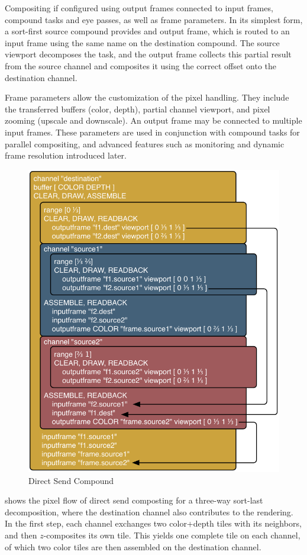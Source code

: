 Compositing if configured using output frames connected to input frames,
compound tasks and eye passes, as well as frame parameters. In its simplest
form, a sort-first source compound provides and output frame, which is routed to
an input frame using the same name on the destination compound. The source
viewport decomposes the task, and the output frame collects this partial result
from the source channel and composites it using the correct offset onto the
destination channel.

Frame parameters allow the customization of the pixel handling. They include the
transferred buffers (color, depth), partial channel viewport, and pixel zooming
(upscale and downscale). An output frame may be connected to multiple input
frames. These parameters are used in conjunction with compound tasks for
parallel compositing, and advanced features such as monitoring and dynamic frame
resolution introduced later.

\begin{figure}
 \includegraphics[width=.618\textwidth]{images/directSendCompound}
 {\caption{\label{fDirectSendCmp}Direct Send Compound}}
\end{figure}

 shows the pixel flow of direct send composting for a three-way
sort-last decomposition, where the destination channel also contributes to the
rendering. In the first step, each channel exchanges two color+depth tiles with
its neighbors, and then $z$-composites its own tile. This yields one complete
tile on each channel, of which two color tiles are then assembled on the
destination channel.

